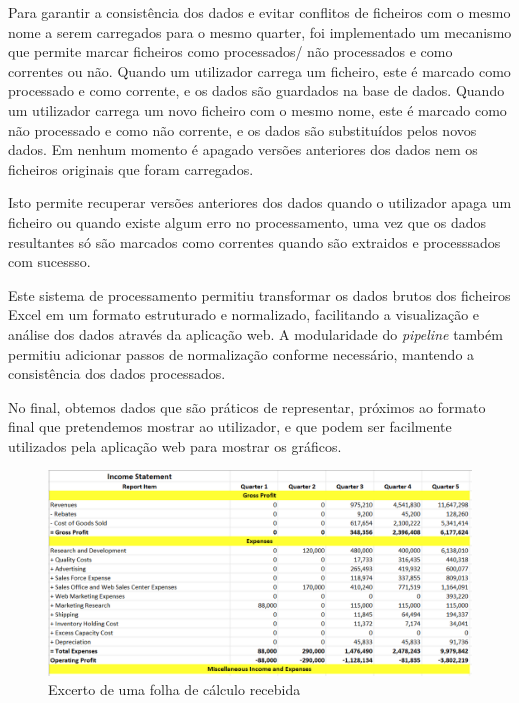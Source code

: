 Para garantir a consistência dos dados e evitar conflitos de ficheiros com o mesmo nome a serem carregados para o mesmo quarter, foi implementado um mecanismo que permite marcar ficheiros como processados/ não processados e como correntes ou não. Quando um utilizador carrega um ficheiro, este é marcado como processado e como corrente, e os dados são guardados na base de dados. Quando um utilizador carrega um novo ficheiro com o mesmo nome, este é marcado como não processado e como não corrente, e os dados são substituídos pelos novos dados. Em nenhum momento é apagado versões anteriores dos dados nem os ficheiros originais que foram carregados.

Isto permite recuperar versões anteriores dos dados quando o utilizador apaga um ficheiro ou quando existe algum erro no processamento, uma vez que os dados resultantes só são marcados como correntes quando são extraidos e processsados com sucessso.

Este sistema de processamento permitiu transformar os dados brutos dos ficheiros Excel em um formato estruturado e normalizado, facilitando a visualização e análise dos dados através da aplicação web. A modularidade do \textit{pipeline} também permitiu adicionar passos de normalização conforme necessário, mantendo a consistência dos dados processados.

No final, obtemos dados que são práticos de representar, próximos ao formato final que pretendemos mostrar ao utilizador, e que podem ser facilmente utilizados pela aplicação web para mostrar os gráficos.

\begin{figure}[H]
\centering
\includegraphics[width=\textwidth]{./img/before}
\caption{Excerto de uma folha de cálculo recebida}
\end{figure}


